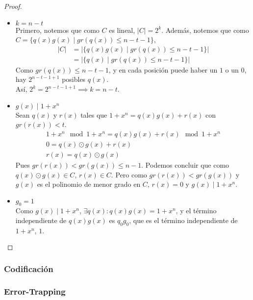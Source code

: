 \begin{proof}
\begin{itemize}
\begin{enumerate}
    \end{enumerate}
    \item $k = n - t$\\
    Primero, notemos que como $C$ es lineal, $\left| C \right| = 2^k$. Además, notemos que como $C = \{ q(x)g(x) \mid gr(q(x)) \le n - t - 1 \}$,
    \begin{align}
         \left| C \right|
         &= \left| \{ q(x)g(x) \mid gr(q(x)) \le n - t - 1 \} \right| \\
         &= \left| \{ q(x) \mid gr(q(x)) \le n - t - 1 \} \right|
    \end{align}
    Como $gr(q(x)) \le n - t - 1$, y en cada posición puede haber un $1$ o un $0$, hay $2^{n-t-1+1}$ posibles $q(x)$.\\
    Así, $2^k = 2^{n-t-1+1} \implies k = n-t$.
    \item $g(x) \mid 1+x^n$\\
    Sean $q(x)$ y $r(x)$ tales que $1+x^n = q(x)g(x)+r(x)$ con $gr(r(x)) < t$.
    \begin{align}
       1+x^n \mod{1+x^n} = q(x)g(x) + r(x) \mod{1+x^n}\\
       0 = q(x) \odot g(x) + r(x)\\
       r(x) = q(x) \odot g(x)
    \end{align}
    Pues $gr(r(x)) < gr(g(x)) \le n-1$. Podemos concluir que como $q(x) \odot g(x) \in C$, $r(x) \in C$. Pero como $gr(r(x)) < gr(g(x))$ y $g(x)$ es el polinomio de menor grado en $C$, $r(x) = 0$ y $g(x) \mid 1+x^n$.
    \item $g_0 = 1$\\
    Como $g(x) \mid 1+x^n$, $\exists q(x) : q(x)g(x) = 1+x^n$, y el término independiente de $q(x)g(x)$ es $q_0g_0$, que es el término independiente de $1+x^n$, $1$.
    \end{itemize}
\end{proof}
\subsubsection{Codificación}
\subsubsection{Error-Trapping}